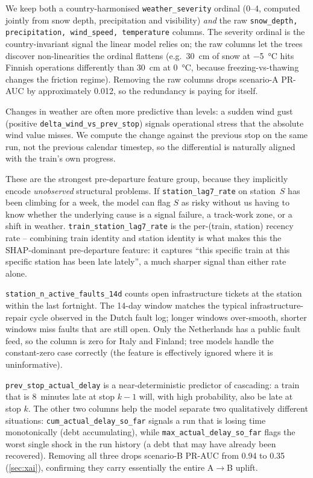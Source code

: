 \begin{description}[leftmargin=2.0em, style=nextline, itemsep=4pt]
    \item[Weather (5 columns).] We keep both a country-harmonised \texttt{weather\_severity} ordinal (0--4, computed jointly from snow depth, precipitation and visibility) \emph{and} the raw \texttt{snow\_depth, precipitation, wind\_speed, temperature} columns. The severity ordinal is the country-invariant signal the linear model relies on; the raw columns let the trees discover non-linearities the ordinal flattens (e.g.\ \SI{30}{cm} of snow at \SI{-5}{\celsius} hits Finnish operations differently than \SI{30}{cm} at \SI{0}{\celsius}, because freezing-vs-thawing changes the friction regime). Removing the raw columns drops scenario-A PR-AUC by approximately \num{0.012}, so the redundancy is paying for itself.
    \item[Weather differential (2 columns).] Changes in weather are often more predictive than levels: a sudden wind gust (positive \texttt{delta\_wind\_vs\_prev\_stop}) signals operational stress that the absolute wind value misses. We compute the change against the previous stop on the same run, not the previous calendar timestep, so the differential is naturally aligned with the train's own progress.
    \item[Lag features (7 columns).] These are the strongest pre-departure feature group, because they implicitly encode \emph{unobserved} structural problems. If \texttt{station\_lag7\_rate} on station~$S$ has been climbing for a week, the model can flag $S$ as risky without us having to know whether the underlying cause is a signal failure, a track-work zone, or a shift in weather. \texttt{train\_station\_lag7\_rate} is the per-(train, station) recency rate -- combining train identity and station identity is what makes this the SHAP-dominant pre-departure feature: it captures ``this specific train at this specific station has been late lately'', a much sharper signal than either rate alone.
    \item[Fault context (1 column).] \texttt{station\_n\_active\_faults\_14d} counts open infrastructure tickets at the station within the last fortnight. The 14-day window matches the typical infrastructure-repair cycle observed in the Dutch fault log; longer windows over-smooth, shorter windows miss faults that are still open. Only the Netherlands has a public fault feed, so the column is zero for Italy and Finland; tree models handle the constant-zero case correctly (the feature is effectively ignored where it is uninformative).
    \item[Inflight (3 columns, scenario~B only).] \texttt{prev\_stop\_actual\_delay} is a near-deterministic predictor of cascading: a train that is 8~minutes late at stop $k-1$ will, with high probability, also be late at stop $k$. The other two columns help the model separate two qualitatively different situations: \texttt{cum\_actual\_delay\_so\_far} signals a run that is losing time monotonically (debt accumulating), while \texttt{max\_actual\_delay\_so\_far} flags the worst single shock in the run history (a debt that may have already been recovered). Removing all three drops scenario-B PR-AUC from \num{0.94} to \num{0.35} (\cref{sec:xai}), confirming they carry essentially the entire A$\to$B uplift.

\end{description}
